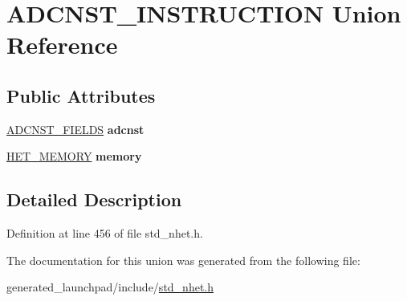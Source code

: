 \hypertarget{unionADCNST__INSTRUCTION}{}\section{A\+D\+C\+N\+S\+T\+\_\+\+I\+N\+S\+T\+R\+U\+C\+T\+I\+ON Union Reference}
\label{unionADCNST__INSTRUCTION}
\subsection*{Public Attributes}
\begin{DoxyCompactItemize}
\item 
\mbox{\label{unionADCNST__INSTRUCTION_ae230af962559709da17a61472bcd044f}} 
\mbox{\hyperlink{structADCNST__format}{A\+D\+C\+N\+S\+T\+\_\+\+F\+I\+E\+L\+DS}} {\bfseries adcnst}
\item 
\mbox{\label{unionADCNST__INSTRUCTION_ab4cf51a90e8288e0abb245e409dba14c}} 
\mbox{\hyperlink{structmemory__format}{H\+E\+T\+\_\+\+M\+E\+M\+O\+RY}} {\bfseries memory}
\end{DoxyCompactItemize}


\subsection{Detailed Description}


Definition at line 456 of file std\+\_\+nhet.\+h.



The documentation for this union was generated from the following file\+:\begin{DoxyCompactItemize}
\item 
generated\+\_\+launchpad/include/\mbox{\hyperlink{std__nhet_8h}{std\+\_\+nhet.\+h}}\end{DoxyCompactItemize}
